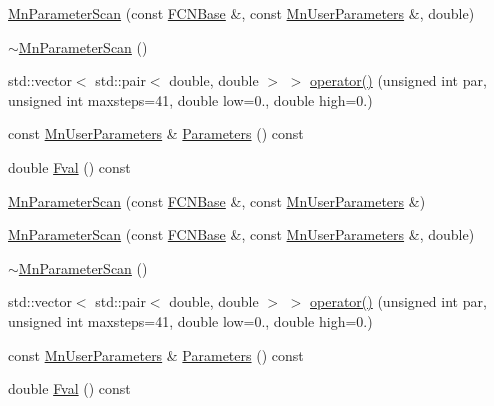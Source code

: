 \begin{DoxyCompactItemize}
\item 
\mbox{\hyperlink{classROOT_1_1Minuit2_1_1MnParameterScan_a741d7ce09e8fb56ab0f1345e8c8520c8}{Mn\+Parameter\+Scan}} (const \mbox{\hyperlink{classROOT_1_1Minuit2_1_1FCNBase}{F\+C\+N\+Base}} \&, const \mbox{\hyperlink{classROOT_1_1Minuit2_1_1MnUserParameters}{Mn\+User\+Parameters}} \&, double)
\item 
\mbox{\hyperlink{classROOT_1_1Minuit2_1_1MnParameterScan_af9a8ee2b797033783fe832ebe727ddc2}{$\sim$\+Mn\+Parameter\+Scan}} ()
\item 
std\+::vector$<$ std\+::pair$<$ double, double $>$ $>$ \mbox{\hyperlink{classROOT_1_1Minuit2_1_1MnParameterScan_aea28c9f299305c9ee1a0f5ad4b44a4e3}{operator()}} (unsigned int par, unsigned int maxsteps=41, double low=0., double high=0.)
\item 
const \mbox{\hyperlink{classROOT_1_1Minuit2_1_1MnUserParameters}{Mn\+User\+Parameters}} \& \mbox{\hyperlink{classROOT_1_1Minuit2_1_1MnParameterScan_aacca13f3ec5fe5acd706dee93edb56d4}{Parameters}} () const
\item 
double \mbox{\hyperlink{classROOT_1_1Minuit2_1_1MnParameterScan_a7251577562ac12179ea9669e9a10bac7}{Fval}} () const
\item 
\mbox{\hyperlink{classROOT_1_1Minuit2_1_1MnParameterScan_a74db5691c231aae4eb0291501a046ae4}{Mn\+Parameter\+Scan}} (const \mbox{\hyperlink{classROOT_1_1Minuit2_1_1FCNBase}{F\+C\+N\+Base}} \&, const \mbox{\hyperlink{classROOT_1_1Minuit2_1_1MnUserParameters}{Mn\+User\+Parameters}} \&)
\item 
\mbox{\hyperlink{classROOT_1_1Minuit2_1_1MnParameterScan_a741d7ce09e8fb56ab0f1345e8c8520c8}{Mn\+Parameter\+Scan}} (const \mbox{\hyperlink{classROOT_1_1Minuit2_1_1FCNBase}{F\+C\+N\+Base}} \&, const \mbox{\hyperlink{classROOT_1_1Minuit2_1_1MnUserParameters}{Mn\+User\+Parameters}} \&, double)
\item 
\mbox{\hyperlink{classROOT_1_1Minuit2_1_1MnParameterScan_af9a8ee2b797033783fe832ebe727ddc2}{$\sim$\+Mn\+Parameter\+Scan}} ()
\item 
std\+::vector$<$ std\+::pair$<$ double, double $>$ $>$ \mbox{\hyperlink{classROOT_1_1Minuit2_1_1MnParameterScan_aea28c9f299305c9ee1a0f5ad4b44a4e3}{operator()}} (unsigned int par, unsigned int maxsteps=41, double low=0., double high=0.)
\item 
const \mbox{\hyperlink{classROOT_1_1Minuit2_1_1MnUserParameters}{Mn\+User\+Parameters}} \& \mbox{\hyperlink{classROOT_1_1Minuit2_1_1MnParameterScan_aacca13f3ec5fe5acd706dee93edb56d4}{Parameters}} () const
\item 
double \mbox{\hyperlink{classROOT_1_1Minuit2_1_1MnParameterScan_a7251577562ac12179ea9669e9a10bac7}{Fval}} () const
\end{DoxyCompactItemize}


